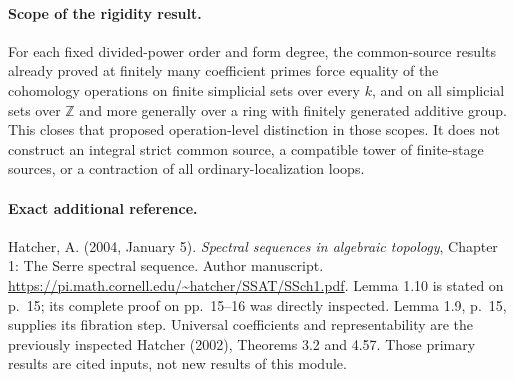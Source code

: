 \paragraph{Scope of the rigidity result.}
For each fixed divided-power order and form degree,
the common-source results already proved at finitely
many coefficient primes force equality of the
cohomology operations on finite simplicial sets
over every $k$, and on all simplicial sets over
$\mathbb Z$ and more generally over a ring with
finitely generated additive group. This closes
that proposed operation-level distinction in
those scopes. It does not construct an integral
strict common source, a compatible tower of
finite-stage sources, or a contraction of all
ordinary-localization loops.

\paragraph{Exact additional reference.}
Hatcher, A. (2004, January 5). \emph{Spectral sequences
in algebraic topology}, Chapter 1: The Serre spectral
sequence. Author manuscript.
\url{https://pi.math.cornell.edu/~hatcher/SSAT/SSch1.pdf}.
Lemma 1.10 is stated on p.~15; its complete proof on
pp.~15--16 was directly inspected. Lemma 1.9, p.~15, supplies its fibration
step. Universal coefficients and representability are
the previously inspected Hatcher (2002), Theorems 3.2
and 4.57. Those primary results are cited inputs, not
new results of this module.
